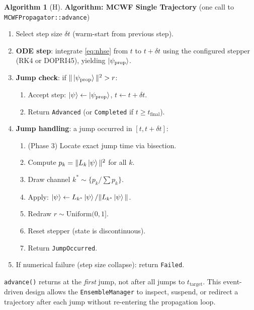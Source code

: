 \documentclass[11pt,a4paper,twoside]{book}
\newcommand{\code}[1]{\texttt{\small#1}}
\theoremstyle{definition}
\newtheorem{algorithm}{Algorithm}[chapter]
\theoremstyle{remark}
\begin{document}
\begin{algorithm}[H]
\label{alg:mcwf}
\textbf{Algorithm: MCWF Single Trajectory} (one call to
\code{MCWFPropagator::advance})

\begin{enumerate}[leftmargin=2em,label=\arabic*.]
  \item Select step size $\delta t$ (warm-start from previous step).
  \item \textbf{ODE step}: integrate \cref{eq:nhse} from $t$ to $t + \delta t$
        using the configured stepper (RK4 or DOPRI45), yielding
        $\ket{\psi_{\mathrm{prop}}}$.
  \item \textbf{Jump check}: if $\|\ket{\psi_{\mathrm{prop}}}\|^2 > r$:
    \begin{enumerate}[label=3\alph*.]
      \item Accept step: $\ket{\psi} \leftarrow \ket{\psi_{\mathrm{prop}}}$,
            $t \leftarrow t + \delta t$.
      \item Return \code{Advanced} (or \code{Completed} if $t \geq t_{\mathrm{final}}$).
    \end{enumerate}
  \item \textbf{Jump handling}: a jump occurred in $[t, t+\delta t]$:
    \begin{enumerate}[label=4\alph*.]
      \item (Phase 3) Locate exact jump time via bisection.
      \item Compute $p_k = \|L_k\ket{\psi}\|^2$ for all $k$.
      \item Draw channel $k^* \sim \{p_k / \sum p_k\}$.
      \item Apply: $\ket{\psi} \leftarrow L_{k^*}\ket{\psi} / \|L_{k^*}\ket{\psi}\|$.
      \item Redraw $r \sim \mathrm{Uniform}(0,1]$.
      \item Reset stepper (state is discontinuous).
      \item Return \code{JumpOccurred}.
    \end{enumerate}
  \item If numerical failure (step size collapse): return \code{Failed}.
\end{enumerate}
\end{algorithm}

\begin{notebox}
  \code{advance()} returns at the \emph{first} jump, not after all jumps
  to $t_{\mathrm{target}}$. This event-driven design allows the
  \code{EnsembleManager} to inspect, suspend, or redirect a trajectory
  after each jump without re-entering the propagation loop.
\end{notebox}
\end{document}
